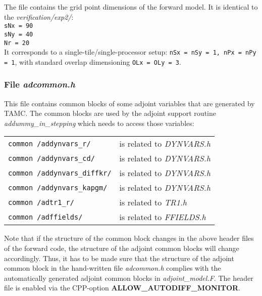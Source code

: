 The file contains the grid point dimensions of the forward
model. It is identical to the {\it verification/exp2/}: \\
\hspace*{4ex} {\tt sNx = 90} \\
\hspace*{4ex} {\tt sNy = 40} \\
\hspace*{4ex} {\tt Nr = 20} \\
It corresponds to a single-tile/single-processor setup:
{\tt nSx = nSy = 1, nPx = nPy = 1},
with standard overlap dimensioning
{\tt OLx = OLy = 3}.

\subsubsection{File {\it adcommon.h}}

This file contains common blocks of some adjoint variables
that are generated by TAMC. 
The common blocks are used by the adjoint support routine
{\it addummy\_in\_stepping} which needs to access those variables:

\begin{tabular}{ll}
\hspace*{4ex} {\tt common /addynvars\_r/} &
\hspace*{4ex} is related to {\it DYNVARS.h} \\
\hspace*{4ex} {\tt common /addynvars\_cd/} &
\hspace*{4ex} is related to {\it DYNVARS.h} \\
\hspace*{4ex} {\tt common /addynvars\_diffkr/} &
\hspace*{4ex} is related to {\it DYNVARS.h} \\
\hspace*{4ex} {\tt common /addynvars\_kapgm/} &
\hspace*{4ex} is related to {\it DYNVARS.h} \\
\hspace*{4ex} {\tt common /adtr1\_r/} &
\hspace*{4ex} is related to {\it TR1.h} \\
\hspace*{4ex} {\tt common /adffields/} &
\hspace*{4ex} is related to {\it FFIELDS.h}\\
\end{tabular}

Note that if the structure of the common block changes in the 
above header files of the forward code, the structure
of the adjoint common blocks will change accordingly.
Thus, it has to be made sure that the structure of the
adjoint common block in the hand-written file {\it adcommon.h}
complies with the automatically generated adjoint common blocks
in {\it adjoint\_model.F}.
The header file is enabled via the CPP-option
{\bf ALLOW\_AUTODIFF\_MONITOR}.

